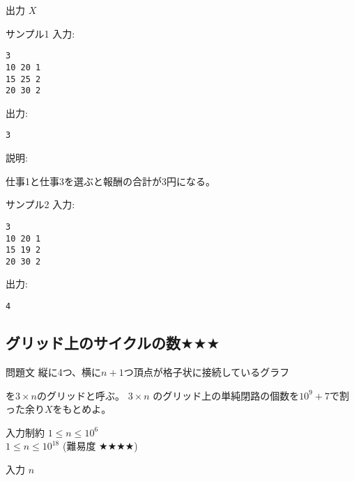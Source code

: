 \documentclass[a4paper,twoside,onecolumn,openany,article,10pt]{memoir}
\theoremstyle{remark}
\begin{document}
\begin{itembox}[l]{出力}
$X$
\end{itembox}

\begin{itembox}[l]{サンプル1}
入力:
\begin{verbatim}
3
10 20 1
15 25 2
20 30 2
\end{verbatim}
出力:
\begin{verbatim}
3
\end{verbatim}
説明:

\vspace{.5em}
仕事1と仕事3を選ぶと報酬の合計が3円になる。
\end{itembox}

\begin{itembox}[l]{サンプル2}
入力:
\begin{verbatim}
3
10 20 1
15 19 2
20 30 2
\end{verbatim}
出力:
\begin{verbatim}
4
\end{verbatim}
\end{itembox}


\clearpage
\subsection{グリッド上のサイクルの数$\bigstar\bigstar\bigstar$}
\begin{itembox}[l]{問題文}
縦に4つ、横に$n+1$つ頂点が格子状に接続しているグラフ

\begin{center}
\end{center}
を$3\times n$のグリッドと呼ぶ。
$3\times n$ のグリッド上の単純閉路の個数を$10^9+7$で割った余り$X$をもとめよ。
\end{itembox}

\begin{itembox}[l]{入力制約}
$1\le n\le 10^6$\\
$1\le n\le 10^{18}$ (難易度 $\bigstar\bigstar\bigstar\bigstar$)
\end{itembox}

\begin{itembox}[l]{入力}
$n$
\end{itembox}
\end{document}
